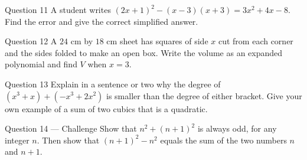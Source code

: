\documentclass[11pt]{article}
\begin{document}
\begin{qbox}{Question 11}
A student writes $(2x+1)^2-(x-3)(x+3)=3x^2+4x-8$. Find the error and give the correct simplified answer.\workspace{3.4cm}
\end{qbox}

\begin{qbox}{Question 12}
A $24$ cm by $18$ cm sheet has squares of side $x$ cut from each corner and the sides folded to make an open box. Write the volume as an expanded polynomial and find $V$ when $x=3$.\workspace{4cm}
\end{qbox}

\begin{qbox}{Question 13}
Explain in a sentence or two why the degree of $(x^3+x)+(-x^3+2x^2)$ is smaller than the degree of either bracket. Give your own example of a sum of two cubics that is a quadratic.\workspace{3cm}
\end{qbox}

\begin{qbox}{Question 14 --- Challenge}
Show that $n^2+(n+1)^2$ is always odd, for any integer $n$. Then show that $(n+1)^2-n^2$ equals the sum of the two numbers $n$ and $n+1$.\workspace{4.2cm}
\end{qbox}

\clearpage
{}
\end{document}
